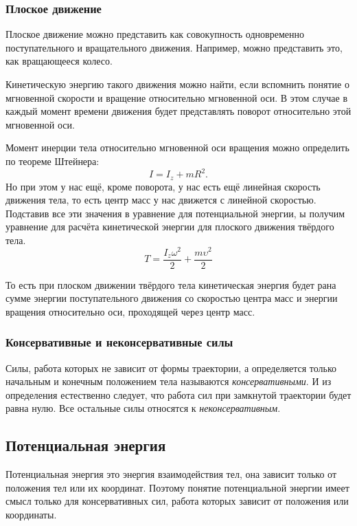 \documentclass[10pt]{extbook}
\begin{document}
\subsubsection{Плоское движение}

Плоское движение можно представить как совокупность одновременно
поступательного и вращательного движения. Например, можно представить это, как
вращающееся колесо.

Кинетическую энергию такого движения можно найти, если вспомнить понятие о
мгновенной скорости и вращение относительно мгновенной оси. В этом случае в
каждый момент времени движения будет представлять поворот относительно этой
мгновенной оси.

Момент инерции тела относительно мгновенной оси вращения можно определить по
теореме Штейнера: \[
	I = I_z + mR^2
	.\] Но при этом у нас ещё, кроме поворота, у нас есть ещё линейная скорость
движения тела, то есть центр масс у нас движется с линейной скоростью. Подставив
все эти значения в уравнение для потенциальной энергии, ы получим уравнение для
расчёта кинетической энергии для плоского движения твёрдого тела.
\begin{equation}
	T = \frac{I_z \omega^2}{2} + \frac{m \upsilon^2}{2}
\end{equation}

То есть при плоском движении твёрдого тела кинетическая энергия будет рана
сумме энергии поступательного движения со скоростью центра масс и энергии
вращения относительно оси, проходящей через центр масс.

\subsubsection{Консервативные и неконсервативные силы}
Силы, работа которых не зависит от формы траектории, а определяется только
начальным и конечным положением тела называются \emph{консервативными}. И из
определения естественно следует, что работа сил при замкнутой траектории будет
равна нулю. Все остальные силы относятся к \emph{неконсервативным}.

\subsection{Потенциальная энергия}

Потенциальная энергия это энергия взаимодействия тел, она зависит только от
положения тел или их координат. Поэтому понятие потенциальной энергии имеет
смысл только для консервативных сил, работа которых зависит от положения или
координаты.
\end{document}
